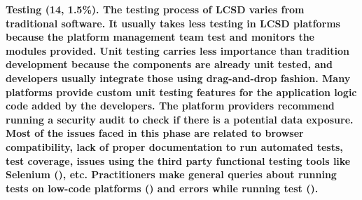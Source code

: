 


\bf{Testing (14, 1.5\%).} %
The testing process of LCSD varies from traditional software. It usually takes less testing in LCSD platforms because the platform management team test and monitors the modules provided. Unit testing carries less importance than tradition development because the components are already unit tested, and developers usually integrate those using drag-and-drop fashion. Many platforms provide custom unit testing features for the application logic code added by the developers. The platform providers recommend running a security audit to check if there is a potential data exposure. Most of the issues faced in this phase are related to browser compatibility, lack of proper documentation to run automated tests, test coverage, issues using the third party functional testing tools like Selenium (), etc. Practitioners make general queries about running tests on low-code platforms () and errors while running test ().





